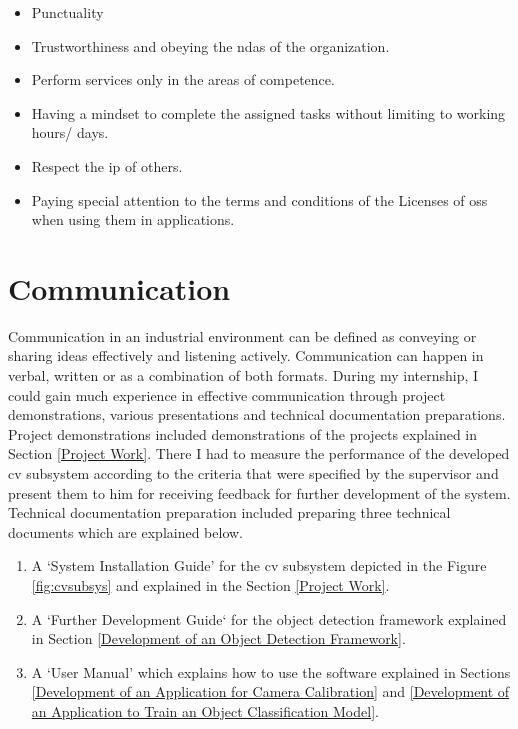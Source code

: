 \documentclass[a4paper,12pt]{report}
\begin{document}
\begin{itemize}
	\item Punctuality
	\item Trustworthiness and obeying the \ac{nda}s of the organization.
	\item Perform services only in the areas of competence.
	\item Having a mindset to complete the assigned tasks without limiting to working hours/ days.
	\item Respect the \ac{ip} of others.
	\item Paying special attention to the terms and conditions of the  Licenses of \ac{oss} when using them in applications.
\end{itemize}

\section{Communication}
Communication in an industrial environment can be defined as conveying or sharing ideas effectively and listening actively. Communication can happen in verbal, written or as a combination of both formats. During my internship, I could gain much experience in effective communication through project demonstrations, various presentations and technical documentation preparations.\\

Project demonstrations included demonstrations of the projects explained in Section \ref{Project Work}. There I had to measure the performance of the developed \ac{cv} subsystem according to the criteria that were specified by the supervisor and present them to him for receiving feedback for further development of the system. Technical documentation preparation included preparing three technical documents which are explained below.

\begin{enumerate}
	\item A `System Installation Guide' for the \ac{cv} subsystem depicted in the Figure \ref{fig:cvsubsys} and explained in the Section \ref{Project Work}. 
	
	\item A `Further Development Guide` for the object detection framework explained in Section \ref{Development of an Object Detection Framework}.
	
	\item A `User Manual' which explains how to use the software explained in Sections \ref{Development of an Application for Camera Calibration} and \ref{Development of an Application to Train an Object Classification Model}.
\end{enumerate}
\end{document}

